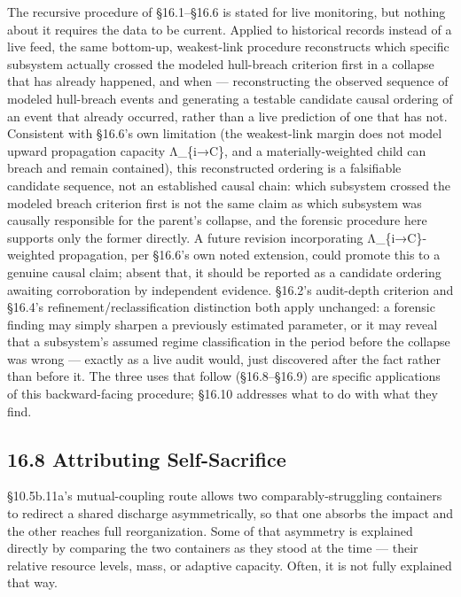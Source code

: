 \documentclass[
]{article}
\begin{document}
The recursive procedure of §16.1--§16.6 is stated for live monitoring,
but nothing about it requires the data to be current. Applied to
historical records instead of a live feed, the same bottom-up,
weakest-link procedure reconstructs which specific subsystem actually
crossed the modeled hull-breach criterion first in a collapse that has
already happened, and when --- reconstructing the observed sequence of
modeled hull-breach events and generating a testable candidate causal
ordering of an event that already occurred, rather than a live
prediction of one that has not. Consistent with §16.6's own limitation
(the weakest-link margin does not model upward propagation capacity
Λ\_\{i→C\}, and a materially-weighted child can breach and remain
contained), this reconstructed ordering is a falsifiable candidate
sequence, not an established causal chain: which subsystem crossed the
modeled breach criterion first is not the same claim as which subsystem
was causally responsible for the parent's collapse, and the forensic
procedure here supports only the former directly. A future revision
incorporating Λ\_\{i→C\}-weighted propagation, per §16.6's own noted
extension, could promote this to a genuine causal claim; absent that, it
should be reported as a candidate ordering awaiting corroboration by
independent evidence. §16.2's audit-depth criterion and §16.4's
refinement/reclassification distinction both apply unchanged: a forensic
finding may simply sharpen a previously estimated parameter, or it may
reveal that a subsystem's assumed regime classification in the period
before the collapse was wrong --- exactly as a live audit would, just
discovered after the fact rather than before it. The three uses that
follow (§16.8--§16.9) are specific applications of this backward-facing
procedure; §16.10 addresses what to do with what they find.

\hypertarget{attributing-self-sacrifice}{%
\subsection{16.8 Attributing
Self-Sacrifice}\label{attributing-self-sacrifice}}

§10.5b.11a's mutual-coupling route allows two comparably-struggling
containers to redirect a shared discharge asymmetrically, so that one
absorbs the impact and the other reaches full reorganization. Some of
that asymmetry is explained directly by comparing the two containers as
they stood at the time --- their relative resource levels, mass, or
adaptive capacity. Often, it is not fully explained that way.
\end{document}
